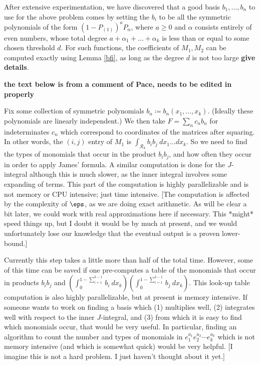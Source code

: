 After extensive experimentation, we have discovered that a good basis $b_1,\dots,b_n$ to use for the above problem comes by setting the $b_i$ to be all the symmetric polynomials of the form $(1-P_{(1)})^a P_\alpha$, where $a \geq 0$ and $\alpha$ consists entirely of even numbers, whose total degree $a + \alpha_1+\dots +\alpha_k$ is less than or equal to some chosen threshold $d$.  For such functions, the coefficients of $M_1,M_2$ can be computed exactly using Lemma \ref{bfi}, as long as the degree $d$ is not too large {\bf give details}.

{\bf the text below is from a comment of Pace, needs to be edited in properly}

Fix some collection of symmetric polynomials $b_n\coloneqq b_n(x_1,\ldots, x_k)$.  (Ideally these polynomials are linearly independent.)  We then take $F=\sum_{n} c_n b_n$ for indeterminates $c_n$ which correspond to coordinates of the matrices after squaring.  In other words, the $(i,j)$ entry of $M_1$ is $\int_{\mathcal{R}_k} b_i b_j\ dx_1\ldots dx_k$.  So we need to find the types of monomials that occur in the product $b_i b_j$, and how often they occur in order to apply James' formula.  A similar computation is done for the $J$-integral although this is much slower, as the inner integral involves some expanding of terms.  This part of the computation is highly parallelizable and is not memory or CPU intensive; just time intensive.  [The computation is affected by the complexity of $\eps$, as we are doing exact arithmetic.  As will be clear a bit later, we could work with real approximations here if necessary.  This *might* speed things up, but I doubt it would be by much at present, and we would unfortunately lose our knowledge that the eventual output is a proven lower-bound.]

Currently this step takes a little more than half of the total time.  However, some of this time can be saved if one pre-computes a table of the monomials that occur in products $b_i b_j$ and $\left(\int_{0}^{1-\sum_{i=1}^{k-1}} b_i\ dx_k\right)\left(\int_{0}^{1-\sum_{i=1}^{k-1}} b_j\ dx_k\right)$.  This look-up table computation is also highly parallelizable, but at present is memory intensive.  If someone wants to work on finding a basis which (1) multiplies well, (2) integrates well with respect to the inner $J$-integral, and (3) from which it is easy to find which monomials occur, that would be very useful.  In particular, finding an algorithm to count the number and types of monomials in $e_1^{a_1}e_2^{a_2}\cdots e_k^{a_k}$ which is not memory intensive (and which is somewhat quick) would be very helpful.  [I imagine this is not a hard problem.  I just haven't thought about it yet.]

